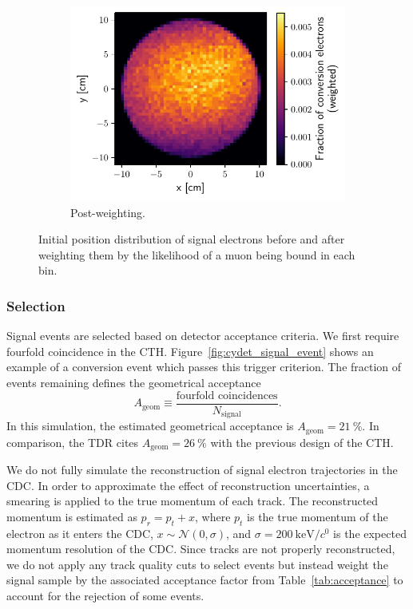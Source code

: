\begin{figure}
\begin{subfigure}[t]{0.329\textwidth}
        \centering
        \includegraphics[width=\textwidth]{chapter6/weighted_conversion_position_distribution.pdf}
        \caption{Post-weighting.}
    \end{subfigure}
    \caption{ Initial position distribution of signal electrons before and after
        weighting them by the likelihood of a muon being bound in each bin. }
    \label{fig:stopping_position_reweighting}
\end{figure}


\subsubsection{Selection}
Signal events are selected based on detector acceptance criteria. We first
require fourfold coincidence in the CTH. Figure~\ref{fig:cydet_signal_event}
shows an example of a conversion event which passes this trigger criterion. The
fraction of events remaining defines the geometrical acceptance 
$$
A_\mathrm{geom} \equiv  \frac{\text{fourfold coincidences}}{N_\mathrm{signal}}.
$$
In this simulation, the estimated geometrical acceptance is $A_\mathrm{geom} =
\SI{21}{\percent}$. In comparison, the TDR cites $A_\mathrm{geom} =
\SI{26}{\percent}$ with the previous design of the CTH.


We do not fully simulate the reconstruction of signal electron trajectories in
the CDC. In order to approximate the effect of reconstruction uncertainties, a
smearing is applied to the true momentum of each track. The reconstructed
momentum is estimated as $p_r = p_t + x$, where $p_t$ is the true momentum of
the electron as it enters the CDC, $x \sim \mathcal{N}(0, \sigma)$, and $\sigma
= \SI{200}{\keV/\clight}$ is the expected momentum resolution of the CDC. Since
tracks are not properly reconstructed, we do not apply any track quality cuts to
select events but instead weight the signal sample by the associated acceptance
factor from Table~\ref{tab:acceptance} to account for the rejection of some
events.

